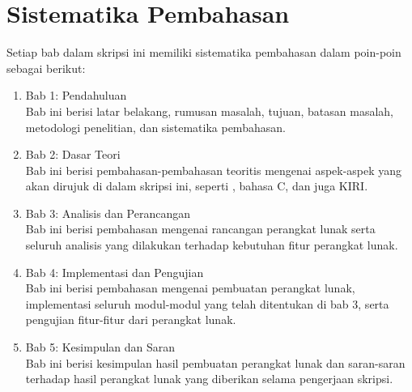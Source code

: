 \section{Sistematika Pembahasan}
\label{sec:sispem}
Setiap bab dalam skripsi ini memiliki sistematika pembahasan dalam poin-poin sebagai berikut:
\begin{enumerate}
	\item Bab 1: Pendahuluan \\
	Bab ini berisi latar belakang, rumusan masalah, tujuan, batasan masalah, metodologi penelitian, dan sistematika pembahasan.
	\item Bab 2: Dasar Teori \\
	Bab ini berisi pembahasan-pembahasan teoritis mengenai aspek-aspek yang akan dirujuk di dalam skripsi ini, seperti \cl, bahasa C, dan juga KIRI.
	\item Bab 3: Analisis dan Perancangan \\
	Bab ini berisi pembahasan mengenai rancangan perangkat lunak serta seluruh analisis yang dilakukan terhadap kebutuhan fitur perangkat lunak.
	\item Bab 4: Implementasi dan Pengujian \\
	Bab ini berisi pembahasan mengenai pembuatan perangkat lunak, implementasi seluruh modul-modul yang telah ditentukan di bab 3, serta pengujian fitur-fitur dari perangkat lunak.
	\item Bab 5: Kesimpulan dan Saran \\
	Bab ini berisi kesimpulan hasil pembuatan perangkat lunak dan saran-saran terhadap hasil perangkat lunak yang diberikan selama pengerjaan skripsi.
\end{enumerate}